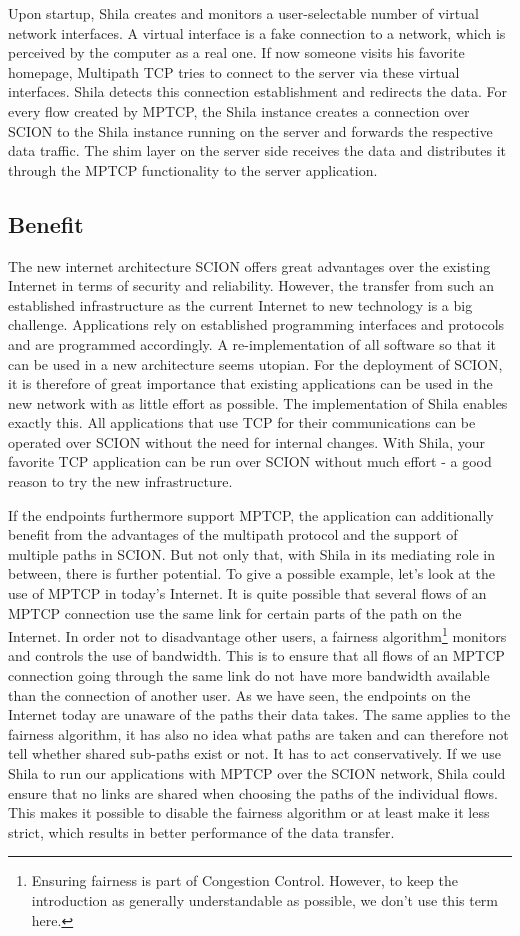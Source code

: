 Upon startup, Shila creates and monitors a user-selectable number of virtual network interfaces. A virtual interface is a fake connection to a network, which is perceived by the computer as a real one. If now someone visits his favorite homepage, Multipath TCP tries to connect to the server via these virtual interfaces. Shila detects this connection establishment and redirects the data.  For every flow created by MPTCP, the Shila instance creates a connection over SCION to the Shila instance running on the server and forwards the respective data traffic. The shim layer on the server side receives the data and distributes it through the MPTCP functionality to the server application.

\subsection*{Benefit}

The new internet architecture SCION offers great advantages over the existing Internet in terms of security and reliability. However, the transfer from such an established infrastructure as the current Internet to new technology is a big challenge. Applications rely on established programming interfaces and protocols and are programmed accordingly. A re-implementation of all software so that it can be used in a new architecture seems utopian. For the deployment of SCION, it is therefore of great importance that existing applications can be used in the new network with as little effort as possible. The implementation of Shila enables exactly this. All applications that use TCP for their communications can be operated over SCION without the need for internal changes. With Shila, your favorite TCP application can be run over SCION without much effort - a good reason to try the new infrastructure.

If the endpoints furthermore support MPTCP, the application can additionally benefit from the advantages of the multipath protocol and the support of multiple paths in SCION. But not only that, with Shila in its mediating role in between, there is further potential. To give a possible example, let's look at the use of MPTCP in today's Internet. It is quite possible that several flows of an MPTCP connection use the same link for certain parts of the path on the Internet. In order not to disadvantage other users, a fairness algorithm\footnote{Ensuring fairness is part of Congestion Control. However, to keep the introduction as generally understandable as possible, we don't use this term here.} monitors and controls the use of bandwidth. This is to ensure that all flows of an MPTCP connection going through the same link do not have more bandwidth available than the connection of another user. As we have seen, the endpoints on the Internet today are unaware of the paths their data takes. The same applies to the fairness algorithm, it has also no idea what paths are taken and can therefore not tell whether shared sub-paths exist or not. It has to act conservatively. If we use Shila to run our applications with MPTCP over the SCION network, Shila could ensure that no links are shared when choosing the paths of the individual flows. This makes it possible to disable the fairness algorithm or at least make it less strict, which results in better performance of the data transfer.